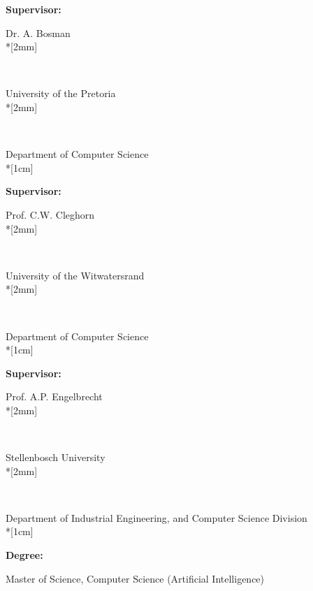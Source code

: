 \pagestyle{empty}
\vspace*{\fill}
\noindent
\parbox{4cm}{\textbf{Supervisor:}} Dr. A. Bosman \\*[2mm]
\parbox{4cm}{\textbf{~}} University of the Pretoria \\*[2mm]
\parbox{4cm}{\textbf{~}} Department of Computer Science\\*[1cm]
\parbox{4cm}{\textbf{Supervisor:}} Prof. C.W. Cleghorn \\*[2mm]
\parbox{4cm}{\textbf{~}} University of the Witwatersrand\\*[2mm]
\parbox{4cm}{\textbf{~}} Department of Computer Science\\*[1cm]
\parbox{4cm}{\textbf{Supervisor:}} Prof. A.P. Engelbrecht \\*[2mm]
\parbox{4cm}{\textbf{~}} Stellenbosch University\\*[2mm]
\parbox{4cm}{\textbf{~}} Department of Industrial Engineering, and Computer Science Division\\*[1cm]
\parbox{4cm}{\textbf{Degree:}} Master of Science, Computer Science (Artificial Intelligence)
\newpage
